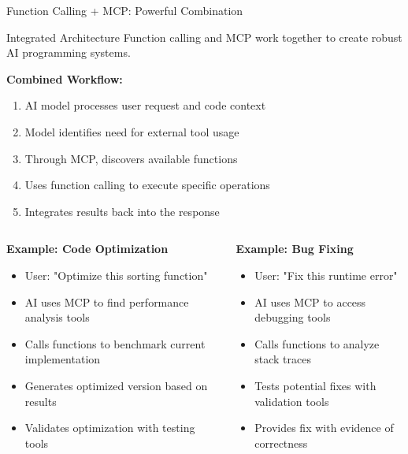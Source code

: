 \documentclass{beamer}
\begin{document}
\begin{frame}[t]{Function Calling + MCP: Powerful Combination}
    \begin{block}{Integrated Architecture}
        Function calling and MCP work together to create robust AI programming systems.
    \end{block}
    
    \textbf{Combined Workflow:}
    \begin{enumerate}
        \item AI model processes user request and code context
        \item Model identifies need for external tool usage
        \item Through MCP, discovers available functions
        \item Uses function calling to execute specific operations
        \item Integrates results back into the response
    \end{enumerate}
    
    \begin{columns}[t]
        \begin{column}{0.5\textwidth}
            \textbf{Example: Code Optimization}
            \begin{itemize}
                \item User: "Optimize this sorting function"
                \item AI uses MCP to find performance analysis tools
                \item Calls functions to benchmark current implementation
                \item Generates optimized version based on results
                \item Validates optimization with testing tools
            \end{itemize}
        \end{column}
        \begin{column}{0.5\textwidth}
            \textbf{Example: Bug Fixing}
            \begin{itemize}
                \item User: "Fix this runtime error"
                \item AI uses MCP to access debugging tools
                \item Calls functions to analyze stack traces
                \item Tests potential fixes with validation tools
                \item Provides fix with evidence of correctness
            \end{itemize}
        \end{column}
    \end{columns}
\end{frame}
\end{document}

